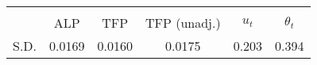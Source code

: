 \begin{tabular}{l*{1}{ccccc}}
\toprule
                &\multicolumn{5}{c}{}                             \\
                &  ALP&  TFP&TFP (unadj.)&$ u_t $&$ \theta_t $\\
\midrule
S.D.              &   0.0169&   0.0160&   0.0175&    0.203&    0.394\\
\bottomrule
\end{tabular}
